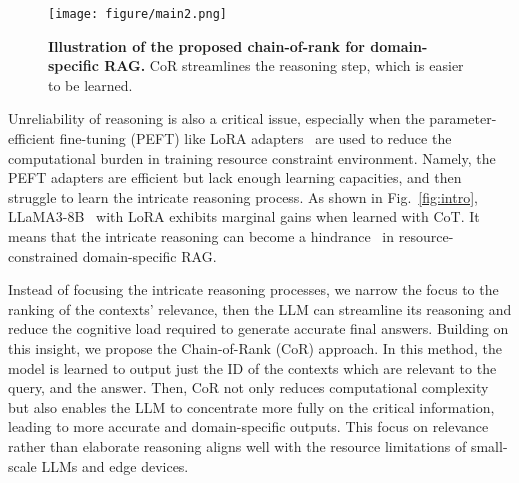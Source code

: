 \begin{figure*}[t]
    \centering
    \texttt{[image: figure/main2.png]}
    \vspace{-0.5cm}
    \caption{\textbf{Illustration of the proposed chain-of-rank for domain-specific RAG.} CoR streamlines the reasoning step, which is easier to be learned.}
    \label{fig:main}
    \vspace{-0.3cm}
\end{figure*}

Unreliability of reasoning is also a critical issue, especially when the parameter-efficient fine-tuning (PEFT) like LoRA adapters~\cite{hu2021lora,huang2023lorahub,bang2024crayon} are used to reduce the computational burden in training resource constraint environment. Namely, the PEFT adapters are efficient but lack enough learning capacities, and then struggle to learn the intricate reasoning process. As shown in Fig.~\ref{fig:intro}, LLaMA3-8B~\cite{dubey2024llama} with LoRA exhibits marginal gains when learned with CoT. It means that the intricate reasoning can become a hindrance~\cite{shi2023large} in resource-constrained domain-specific RAG.


Instead of focusing the intricate reasoning processes, we narrow the focus to the ranking of the contexts' relevance, then the LLM can streamline its reasoning and reduce the cognitive load required to generate accurate final answers. Building on this insight, we propose the Chain-of-Rank (CoR) approach. In this method, the model is learned to output just the ID of the contexts which are relevant to the query, and the answer. Then, CoR not only reduces computational complexity but also enables the LLM to concentrate more fully on the critical information, leading to more accurate and domain-specific outputs. This focus on relevance rather than elaborate reasoning aligns well with the resource limitations of small-scale LLMs and edge devices.
